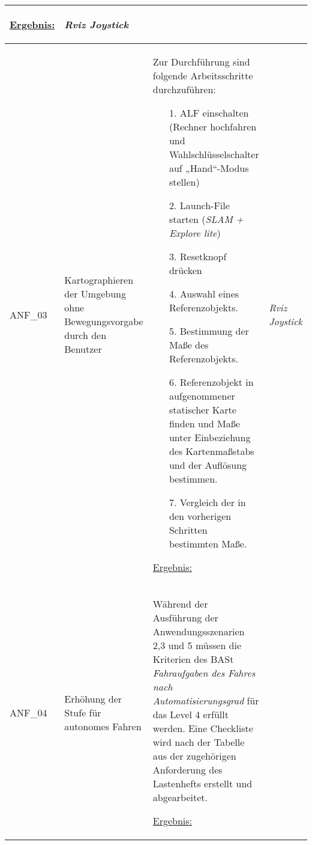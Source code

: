 \documentclass[12pt,a4paper,oneside,numbers=noenddot,captions=tableheading,toc=bibliography,openany,tikz,margin=5mm]{scrbook}
\begin{document}
\begin{longtable}{|p{}|p{}|p{7cm}|p{}|}
\begin{itemize}
		
		
	\end{itemize}
	
	\underline{Ergebnis:}\newline
   \newline
	
	\textbf{}%
	
	& \textit{Rviz \newline Joystick}\\
	\hline
	ANF\_03 & Kartographieren der Umgebung ohne Bewegungsvorgabe durch den Benutzer& Zur Durchführung sind folgende Arbeitsschritte durchzuführen:
	\begin{itemize}
		
		
		\item[1.]	ALF einschalten (Rechner hochfahren und Wahlschlüsselschalter auf „Hand“-Modus stellen)
		\item[2.]	Launch-File starten (\textit{SLAM + Explore lite})
		\item[3.]	Resetknopf drücken
		\item[4.]	Auswahl eines Referenzobjekts.
		\item[5.]	Bestimmung der Maße des Referenzobjekts.
		\item[6.]	Referenzobjekt in aufgenommener statischer Karte finden und Maße unter Einbeziehung des Kartenmaßstabs und der Auflösung bestimmen.
		\item[7.]	Vergleich der in den vorherigen Schritten bestimmten Maße.

		
	\end{itemize}
	
	\underline{Ergebnis:}\newline
	\newline
	
	\textbf{}%
	
	& \textit{Rviz \newline Joystick}\\
	\hline
	ANF\_04 & Erhöhung der Stufe für autonomes Fahren & Während der Ausführung der Anwendungsszenarien 2,3 und 5 müssen die Kriterien des BASt \textit{Fahraufgaben des Fahres nach Automatisierungsgrad} für das Level 4 erfüllt werden. Eine Checkliste wird nach der Tabelle aus der zugehörigen Anforderung des Lastenhefts erstellt und abgearbeitet. \newline
	
	\underline{Ergebnis:}\newline
	

\end{longtable}
\end{document}
